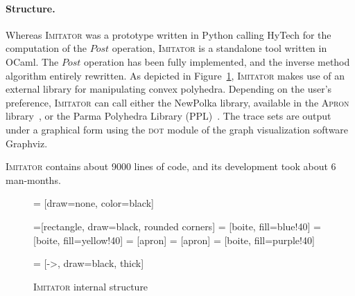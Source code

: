 \documentclass[a4paper,10pt]{article}
\newcommand{\apron}{\textsc{Apron}}
\newcommand{\gdot}{\textsc{dot}}
\newcommand{\graphviz}{Graphviz}
\newcommand{\hytech}{{\sc HyTech}}
\newcommand{\imitator}{\textsc{Imitator}}
\newcommand{\ocaml}{OCaml}
\newcommand{\polka}{NewPolka}
\newcommand{\python}{Python}
\newcommand{\paragraphe}[1]{\paragraph{#1.}}
\begin{document}
\paragraphe{Structure}
Whereas \imitator{} was a prototype written in \python{} calling \hytech{} for the computation of the $\mathit{Post}$ operation, \imitator{} is a standalone tool written in \ocaml{}.
The $\mathit{Post}$ operation has been fully implemented, and the inverse method algorithm entirely rewritten.
As depicted in Figure~\ref{fig:structure}, \imitator{} makes use of an external library for manipulating convex polyhedra.
Depending on the user's preference, \imitator{} can call either the \polka{} library, available in the \apron{} library~\cite{jm09}, or the Parma Polyhedra Library (PPL)~\cite{bhz08}.
The trace sets are output under a graphical form using the \gdot{} module of the graph visualization software \graphviz{}.

\imitator{} contains about 9000 lines of code, and its development took about 6 man-months.

\begin{figure}[ht!]
	 = [draw=none, color=black]
	
	=[rectangle, draw=black, rounded corners]
	 = [boite, fill=blue!40]
	 = [boite, fill=yellow!40]
	 = [apron]
	 = [apron]
	 = [boite, fill=purple!40]

	 = [->, draw=black, thick]
{

\centering


}

\caption{\imitator{} internal structure}
\label{fig:structure}
\end{figure}
\end{document}
